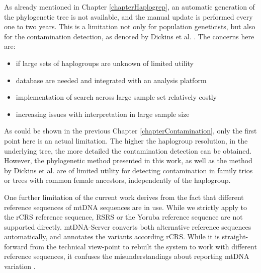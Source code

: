 As already mentioned in Chapter \ref{chapterHaplogrep}, an automatic generation of the phylogenetic tree is not available, and the manual update is performed every one to two years. This is a limitation not only for population geneticists, but also for the contamination detection, as denoted by Dickins et al. \cite{Dickins2014}. The concerns here are:
\begin{itemize}
\item if large sets of haplogroups are unknown of limited utility
\item database are needed and integrated with an analysis platform
\item implementation of search across large sample set relatively costly
\item increasing issues with interpretation in large sample size
\end{itemize}
As could be shown in the previous Chapter \ref{chapterContamination}, only the first point here is an actual limitation. The higher the haplogroup resolution, in the underlying tree, the more detailed the contamination detection can be obtained. However, the phylogenetic method presented in this work, as well as the method by Dickins et al. \cite{Dickins2014} are of limited utility for detecting contamination in family trios or trees with common female ancestors, independently of the haplogroup.

One further limitation of the current work derives from the fact that different reference sequences of mtDNA sequences are in use. While we strictly apply to the rCRS reference sequence, RSRS or the Yoruba reference sequence are not supported directly. mtDNA-Server converts both alternative reference sequences automatically, and annotates the variants according rCRS. While it is straight-forward from the technical view-point to rebuilt the system to work with different reference sequences, it confuses the misunderstandings about reporting mtDNA variation \cite{Bandelt2013}.

